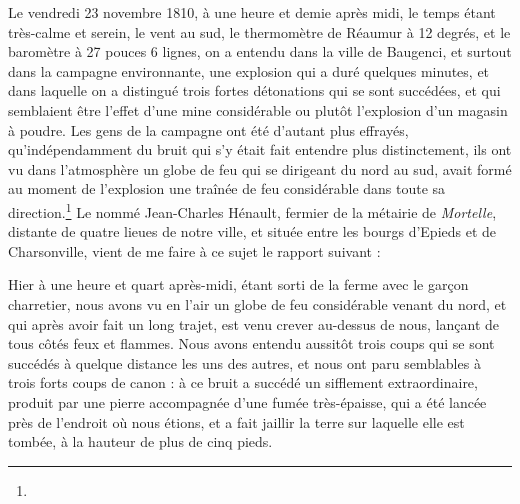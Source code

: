 \documentclass[a4paper, 12pt, oneside, french]{article}
\begin{document}
\og Le vendredi 23 novembre 1810, à une heure et demie après midi, le temps étant très-calme et serein, le vent au sud, le thermomètre de Réaumur à 12 degrés, et le baromètre à 27 pouces 6 lignes, on a entendu dans la ville de Baugenci, et surtout dans la campagne environnante, une explosion qui a duré quelques minutes, et dans laquelle on a distingué trois fortes détonations qui se sont succédées, et qui semblaient être l'effet d'une mine considérable ou plutôt l'explosion d'un magasin à poudre. Les gens de la campagne ont été d'autant plus effrayés, qu'indépendamment du bruit qui s'y était fait entendre plus distinctement, ils ont vu dans l'atmosphère un globe de feu qui se dirigeant du nord au sud, avait formé au moment de l'explosion une traînée de feu considérable dans toute sa direction.\footnote{} Le nommé Jean-Charles Hénault, fermier de la métairie de \emph{Mortelle}, distante de quatre lieues de notre ville, et située entre les bourgs d'Epieds et de Charsonville, vient de me faire à ce sujet le rapport suivant : \fg

\og Hier à une heure et quart après-midi, étant sorti de la ferme avec le garçon charretier, nous avons vu en l'air un globe de feu considérable venant du nord, et qui après avoir fait un long trajet, est venu crever au-dessus de nous, lançant de tous côtés feux et flammes. Nous avons entendu aussitôt trois coups qui se sont succédés à quelque distance les uns des autres, et nous ont paru semblables à trois forts coups de canon : à ce bruit a succédé un sifflement extraordinaire, produit par une pierre accompagnée d'une fumée très-épaisse, qui a été lancée près de l'endroit où nous étions, et a fait jaillir la terre sur laquelle elle est tombée, à la hauteur de plus de cinq pieds. \fg
\end{document}
